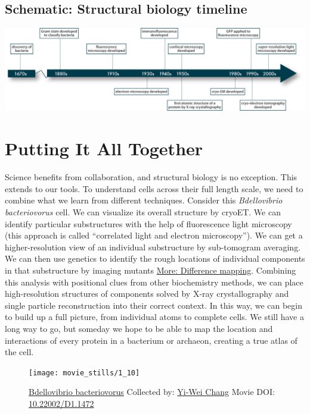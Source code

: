\documentclass[]{tufte-book}
\begin{document}
\hypertarget{Structural_biology_timeline}{\subsection*{Schematic:
Structural biology timeline}\label{Structural_biology_timeline}}

\includegraphics{img/schematics/1_9_1}

\section{Putting It All Together}\label{putting-it-all-together}

Science benefits from collaboration, and structural biology is no
exception. This extends to our tools. To understand cells across their
full length scale, we need to combine what we learn from different
techniques. Consider this \emph{Bdellovibrio bacteriovorus} cell. We can
visualize its overall structure by cryoET. We can identify particular
substructures with the help of fluorescence light microscopy (this
approach is called ``correlated light and electron microscopy''). We can
get a higher-resolution view of an individual substructure by
sub-tomogram averaging. We can then use genetics to identify the rough
locations of individual components in that substructure by imaging
mutants \protect\hyperlink{Difference_mapping}{More: Difference
mapping}. Combining this analysis with positional clues from other
biochemistry methods, we can place high-resolution structures of
components solved by X-ray crystallography and single particle
reconstruction into their correct context. In this way, we can begin to
build up a full picture, from individual atoms to complete cells. We
still have a long way to go, but someday we hope to be able to map the
location and interactions of every protein in a bacterium or archaeon,
creating a true atlas of the cell.





\begin{figure}
\texttt{[image: movie\_stills/1\_10]} \caption[\protect\hyperlink{tree}{Bdellovibrio bacteriovorus}
Collected by: \protect\hyperlink{yi-wei_chang}{Yi-Wei Chang} Movie DOI:
\href{https://doi.org/10.22002/D1.1472}{10.22002/D1.1472}]{\protect\hyperlink{tree}{Bdellovibrio bacteriovorus}
Collected by: \protect\hyperlink{yi-wei_chang}{Yi-Wei Chang} Movie DOI:
\href{https://doi.org/10.22002/D1.1472}{10.22002/D1.1472}}\label{fig:1-10}
\end{figure}
\end{document}
